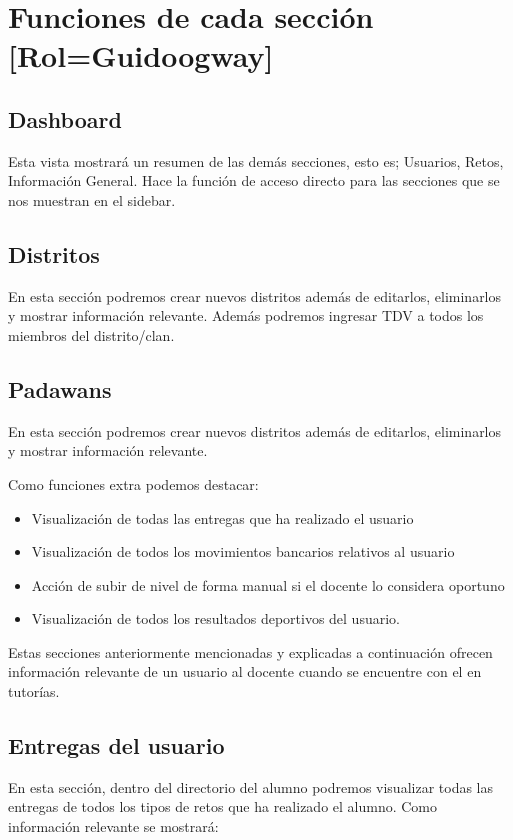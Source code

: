 \newpage


\section{Funciones de cada sección [Rol=Guidoogway]}
\subsection{Dashboard}
Esta vista mostrará un resumen de las demás secciones, esto es; Usuarios, Retos, Información General. Hace la función de acceso directo para las secciones que se nos muestran en el sidebar.

\subsection{Distritos}
En esta sección podremos crear nuevos distritos además de editarlos, eliminarlos y mostrar información relevante. Además podremos ingresar TDV a todos los miembros del distrito/clan.

\subsection{Padawans}
En esta sección podremos crear nuevos distritos además de editarlos, eliminarlos y mostrar información relevante.

Como funciones extra podemos destacar:
\begin{itemize}
	\item Visualización de todas las entregas que ha realizado el usuario
	\item Visualización de todos los movimientos bancarios relativos al usuario
	\item Acción de subir de nivel de forma manual si el docente lo considera oportuno
	\item Visualización de todos los resultados deportivos del usuario.
\end{itemize}

Estas secciones anteriormente mencionadas y explicadas a continuación ofrecen información relevante de un usuario al docente cuando se encuentre con el en tutorías.

\subsection{Entregas del usuario}
En esta sección, dentro del directorio del alumno podremos visualizar todas las entregas de todos los tipos de retos que ha realizado el alumno. Como información relevante se mostrará:

